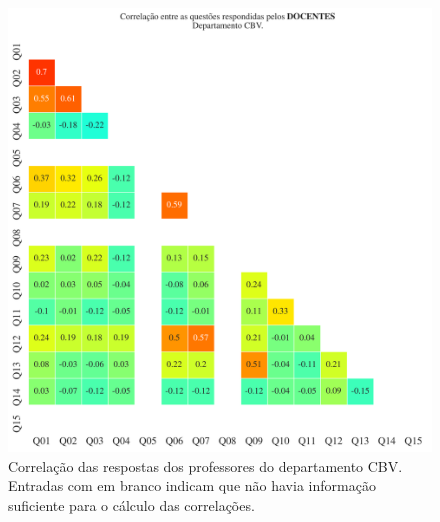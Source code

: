 \documentclass[a4paper,10pt]{article}
\begin{document}
\begin{figure}[h]
\centering
\includegraphics[width=0.999\linewidth]{matriz_corr__CBV_docentes.png}
\caption{\label{fig:corr_docentes}Correlação das respostas dos professores do departamento CBV. Entradas com em branco indicam que não havia informação suficiente para o cálculo das correlações.}
\end{figure}
\end{document}
